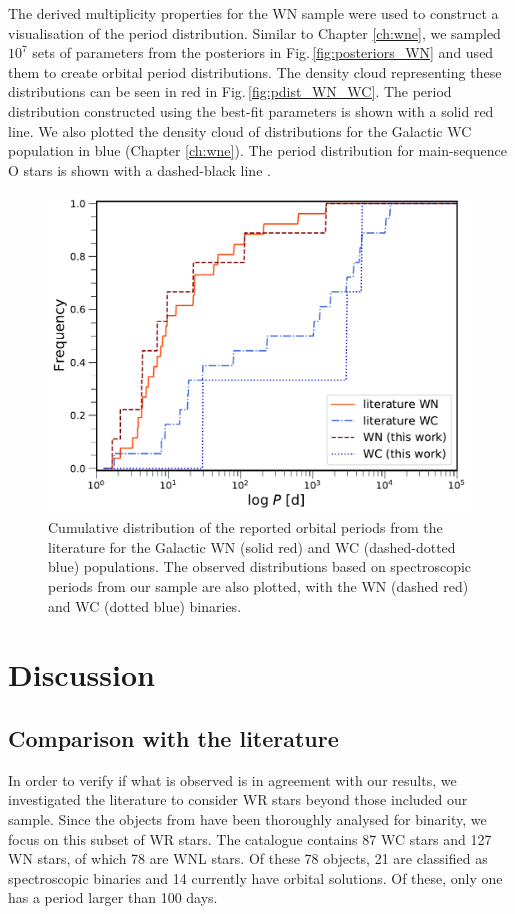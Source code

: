 The derived multiplicity properties for the WN sample were used to construct a visualisation of the period distribution. Similar to Chapter \ref{ch:wne}, we sampled $10^7$ sets of parameters from the posteriors in Fig.\,\ref{fig:posteriors_WN} and used them to create orbital period distributions. The density cloud representing these distributions can be seen in red in Fig.\,\ref{fig:pdist_WN_WC}. The period distribution constructed using the best-fit parameters is shown with a solid red line. We also plotted the density cloud of distributions for the Galactic WC population in blue (Chapter \ref{ch:wne}). The period distribution for main-sequence O stars is shown with a dashed-black line \citep{sana_binary_2012}.
\begin{figure}
    \centering
    \includegraphics[width=\hsize]{chapters/WNL/image/Cumulative_pobs_with_HERMES.pdf}
    \caption{Cumulative distribution of the reported orbital periods from the literature for the Galactic WN (solid red) and WC (dashed-dotted blue) populations. The observed distributions based on spectroscopic periods from our sample are also plotted, with the WN (dashed red) and WC (dotted blue) binaries.}
    \label{fig:obs_pdist_WNL}
\end{figure}
\section{Discussion} \label{sect:discussion_WNL}
\subsection{Comparison with the literature}  \label{sect:lit}
In order to verify if what is observed is in agreement with our results, we investigated the literature to consider WR stars beyond those included our sample. Since the objects from  have been thoroughly analysed for binarity, we focus on this subset of WR stars. The catalogue contains 87 WC stars and 127 WN stars, of which 78 are WNL stars. Of these 78 objects, 21 are classified as spectroscopic binaries and 14 currently have orbital solutions. Of these, only one has a period larger than 100 days.

